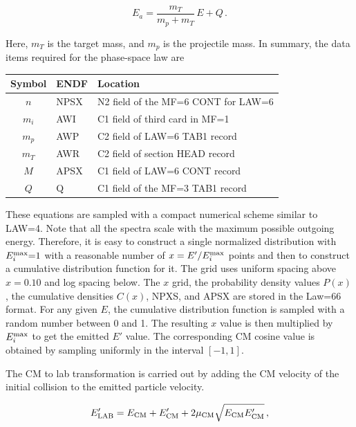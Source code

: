 \begin{equation}
   E_a=\frac{m_T}{m_p+m_T}\,E+Q\,.
\end{equation}
\vspace{0.5 pt}

\noindent
Here, $m_T$ is the target mass, and $m_p$ is the projectile mass.
In summary, the data items required for the phase-space law are

\begin{center}
\begin{tabular}{cll}
Symbol & ENDF & Location \\ \hline
$n$ & NPSX & N2 field of the MF=6 CONT for LAW=6 \\
$m_i$ & AWI & C1 field of third card in MF=1 \\
$m_p$ & AWP & C2 field of LAW=6 TAB1 record \\
$m_T$ & AWR & C2 field of section HEAD record \\
$M$ & APSX & C1 field of LAW=6 CONT record \\
$Q$ & Q & C1 field of the MF=3 TAB1 record \\ \hline
\end{tabular}
\end{center}
\vspace{0.5 pt}

These equations are sampled with a compact numerical scheme
similar to LAW=4.  Note that all the spectra scale with the maximum
possible outgoing energy.  Therefore, it is easy to construct
a single normalized distribution with $E_i^{\rm max}{=}1$ with a
reasonable number of $x=E'/E_i^{\rm max}$ points and then to construct
a cumulative distribution function for it.  The grid uses
uniform spacing above $x=0.10$ and log spacing below.  The $x$ grid,
the probability density values $P(x)$, the cumulative densities
$C(x)$, NPXS, and APSX are stored in the Law=66 format.  For any given $E$,
the cumulative distribution function is sampled with a random
number between 0 and 1. The resulting $x$ value is then multiplied
by $E_i^{\rm max}$ to get the emitted $E'$ value.  The corresponding
CM cosine value is obtained by sampling uniformly in the
interval $[-1,1]$.

The CM to lab transformation is carried out by adding the
CM velocity of the initial collision to the emitted particle
velocity.

\begin{equation}
   E'_{\rm LAB}=E_{\rm CM}+E'_{\rm CM}
     +2\mu_{\rm CM}\sqrt{E_{\rm CM}E'_{\rm CM}}\,,
\end{equation}

